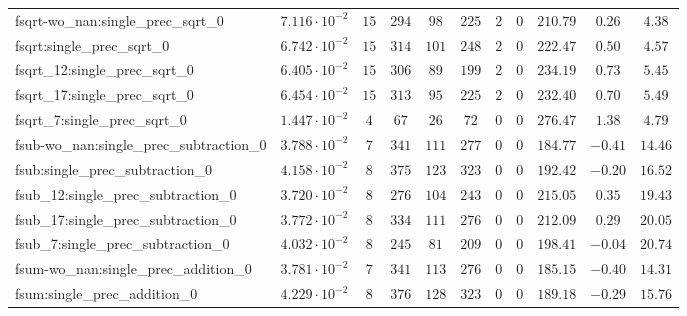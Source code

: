 \begin{tabular}{|l|c|c|c|c|c|c|c|c|c|c|}
fsqrt-wo\_nan:single\_prec\_sqrt\_0            & $ 7.116 \cdot 10^{-2} $ & $ 15     $ & $ 294    $ & $ 98    $ & $ 225    $ & $ 2   $ & $ 0 $ & $ 210.79      $ & $ 0.26    $ & $ 4.38    $ \\
fsqrt:single\_prec\_sqrt\_0                    & $ 6.742 \cdot 10^{-2} $ & $ 15     $ & $ 314    $ & $ 101   $ & $ 248    $ & $ 2   $ & $ 0 $ & $ 222.47      $ & $ 0.50    $ & $ 4.57    $ \\
fsqrt\_12:single\_prec\_sqrt\_0                & $ 6.405 \cdot 10^{-2} $ & $ 15     $ & $ 306    $ & $ 89    $ & $ 199    $ & $ 2   $ & $ 0 $ & $ 234.19      $ & $ 0.73    $ & $ 5.45    $ \\
fsqrt\_17:single\_prec\_sqrt\_0                & $ 6.454 \cdot 10^{-2} $ & $ 15     $ & $ 313    $ & $ 95    $ & $ 225    $ & $ 2   $ & $ 0 $ & $ 232.40      $ & $ 0.70    $ & $ 5.49    $ \\
fsqrt\_7:single\_prec\_sqrt\_0                 & $ 1.447 \cdot 10^{-2} $ & $ 4      $ & $ 67     $ & $ 26    $ & $ 72     $ & $ 0   $ & $ 0 $ & $ 276.47      $ & $ 1.38    $ & $ 4.79    $ \\
fsub-wo\_nan:single\_prec\_subtraction\_0      & $ 3.788 \cdot 10^{-2} $ & $ 7      $ & $ 341    $ & $ 111   $ & $ 277    $ & $ 0   $ & $ 0 $ & $ 184.77      $ & $ -0.41   $ & $ 14.46   $ \\
fsub:single\_prec\_subtraction\_0              & $ 4.158 \cdot 10^{-2} $ & $ 8      $ & $ 375    $ & $ 123   $ & $ 323    $ & $ 0   $ & $ 0 $ & $ 192.42      $ & $ -0.20   $ & $ 16.52   $ \\
fsub\_12:single\_prec\_subtraction\_0          & $ 3.720 \cdot 10^{-2} $ & $ 8      $ & $ 276    $ & $ 104   $ & $ 243    $ & $ 0   $ & $ 0 $ & $ 215.05      $ & $ 0.35    $ & $ 19.43   $ \\
fsub\_17:single\_prec\_subtraction\_0          & $ 3.772 \cdot 10^{-2} $ & $ 8      $ & $ 334    $ & $ 111   $ & $ 276    $ & $ 0   $ & $ 0 $ & $ 212.09      $ & $ 0.29    $ & $ 20.05   $ \\
fsub\_7:single\_prec\_subtraction\_0           & $ 4.032 \cdot 10^{-2} $ & $ 8      $ & $ 245    $ & $ 81    $ & $ 209    $ & $ 0   $ & $ 0 $ & $ 198.41      $ & $ -0.04   $ & $ 20.74   $ \\
fsum-wo\_nan:single\_prec\_addition\_0         & $ 3.781 \cdot 10^{-2} $ & $ 7      $ & $ 341    $ & $ 113   $ & $ 276    $ & $ 0   $ & $ 0 $ & $ 185.15      $ & $ -0.40   $ & $ 14.31   $ \\
fsum:single\_prec\_addition\_0                 & $ 4.229 \cdot 10^{-2} $ & $ 8      $ & $ 376    $ & $ 128   $ & $ 323    $ & $ 0   $ & $ 0 $ & $ 189.18      $ & $ -0.29   $ & $ 15.76   $ \\

\end{tabular}
